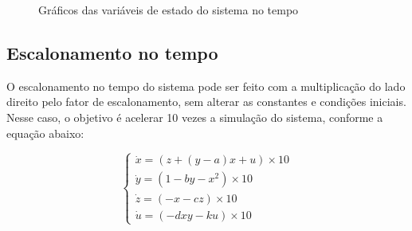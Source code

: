 \documentclass[12pt]{article}
\begin{document}
\begin{figure}[H]
         \par
        \caption{Gráficos das variáveis de estado do sistema no tempo}        
    \end{figure}

    \subsection{Escalonamento no tempo}
    O escalonamento no tempo do sistema pode ser feito com a multiplicação do lado direito pelo fator de escalonamento, sem alterar as constantes e condições iniciais. Nesse caso, o objetivo é acelerar 10 vezes a simulação do sistema, conforme a equação abaixo:
    
    \begin{equation}
        \left\{
            \begin{array}{l}
              \dot{x} = (z + (y - a)x + u)\times 10\\
              \dot{y} = (1 - by - x^2)\times 10\\
              \dot{z} = (-x - cz)\times 10\\
              \dot{u} = (-dxy - ku)\times 10
            \end{array}
          \right.
    \end{equation}
\end{document}
